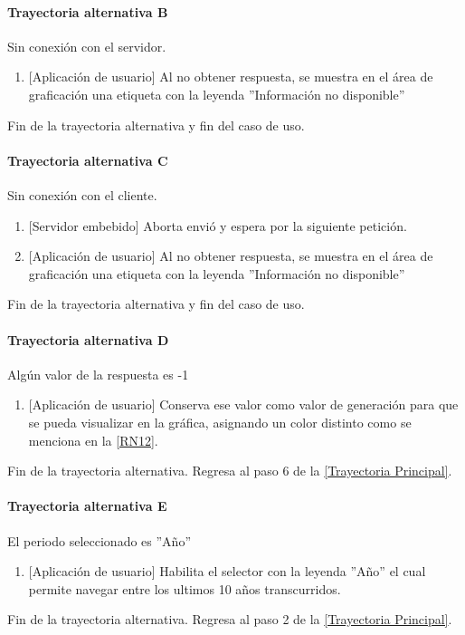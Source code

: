 \paragraph{Trayectoria alternativa B} \label{SUB-U-CU1.3:TB}
	Sin conexión con el servidor.
	\begin{enumerate}[label=B\arabic*.]
		\item {[Aplicación de usuario]} Al no obtener respuesta, se muestra en el área de graficación una etiqueta con la leyenda ''Información no disponible''
	\end{enumerate}
	Fin de la trayectoria alternativa y fin del caso de uso.

\paragraph{Trayectoria alternativa C} \label{SUB-U-CU1.3:TC}
	Sin conexión con el cliente.
	\begin{enumerate}[label=C\arabic*.]
		\item {[Servidor embebido]} Aborta envió y espera por la siguiente petición.
		\item {[Aplicación de usuario]} Al no obtener respuesta, se muestra en el área de graficación una etiqueta con la leyenda ''Información no disponible''
	\end{enumerate}
	Fin de la trayectoria alternativa y fin del caso de uso.
	
\paragraph{Trayectoria alternativa D} \label{SUB-U-CU1.3:TD}
	Algún valor de la respuesta es -1
	\begin{enumerate}[label=D\arabic*.]
		\item {[Aplicación de usuario]} Conserva ese valor como valor de generación para que se pueda visualizar en la gráfica, asignando un color distinto como se menciona en la \ref{RN12}.
	\end{enumerate}
	Fin de la trayectoria alternativa. Regresa al paso 6 de la \hyperref[SUB-U-CU1.3:TP]{[Trayectoria Principal]}.
	
\paragraph{Trayectoria alternativa E} \label{SUB-U-CU1.3:TE}
	El periodo seleccionado es ''Año''
	\begin{enumerate}[label=E\arabic*.]
		\item {[Aplicación de usuario]} Habilita el selector con la leyenda ''Año'' el cual permite navegar entre los ultimos 10 años transcurridos.
	\end{enumerate}
	Fin de la trayectoria alternativa. Regresa al paso 2 de la \hyperref[SUB-U-CU1.3:TP]{[Trayectoria Principal]}.

